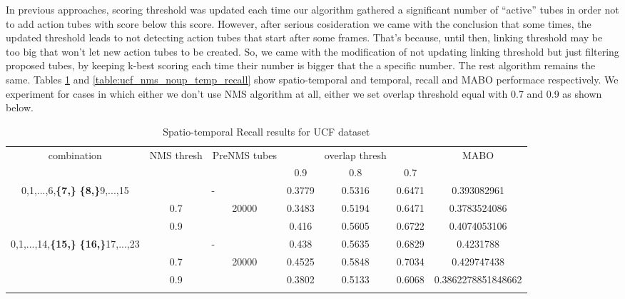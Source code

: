 \documentclass{report}
\begin{document}
In previous approaches, scoring threshold was updated each time our algorithm gathered a significant number of ``active'' tubes in order not
to add action tubes with score below this score. However, after serious cosideration we came with the conclusion that some times, the updated
threshold leads to not detecting action tubes that start after some frames. That's because, until then, linking threshold may be too big that
won't let new action tubes to be created. So, we came with the modification of not updating linking threshold but just filtering proposed
tubes, by keeping k-best scoring each time their number is bigger that the a specific number. The rest algorithm remains the same. Tables
\ref{table:ucf_nms_noup_recall} and \ref{table:ucf_nms_noup_temp_recall} show spatio-temporal and temporal, recall and MABO performace respectively.
We experiment for cases in which either we don't use NMS algorithm at all, either we set overlap threshold equal with 0.7 and 0.9 as shown
below.

\begin{center}
  \setlength{\tabcolsep}{2pt}
\begin{longtable}{||c | c | c | c c c| c|}

  \hline
  \multirow{2}{*}{combination} & \multirow{2}{2.5em}{NMS thresh} & \multirow{2}{3.5em}{PreNMS tubes} &  {} &overlap thresh & {} & \multirow{2}{*}{MABO} \\
  {} & {} & {} &  0.9 &  0.8 & 0.7 & {}\\         
  \hline
  \multirow{3}{7em}{0,1,...,6,\textbf{\{7,\}}
  \textbf{\{8,\}}9,...,15 }   &   \multicolumn{2}{|c|}{-}     &  0.3779 & 0.5316 & 0.6471 & 0.393082961 \\
  \cline{2-7}
  {} & 0.7 &\multirow{2}{*}{20000}  & 0.3483  & 0.5194 & 0.6471 & 0.3783524086 \\
  \cline{2-2} \cline{4-7} 
  {} &  0.9   & {}   & 0.416 & 0.5605 & 0.6722 & 0.4074053106 \\
  \hline                                    
  \multirow{3}{7em}{0,1,...,14,\textbf{\{15,\}}
  \textbf{\{16,\}}17,...,23 }  &   \multicolumn{2}{|c|}{-} & 0.438 & 0.5635 & 0.6829 & 0.4231788 \\
  \cline{2-7}
  {} & 0.7 & \multirow{2}{*}{20000}   & 0.4525 & 0.5848 & 0.7034 & 0.429747438 \\
  \cline{2-2} \cline{4-7} 
  {} &  0.9   & {}   & 0.3802 & 0.5133 & 0.6068 & 0.3862278851848662 \\

  \hline                                    

  \caption{Spatio-temporal Recall results for UCF dataset}
  \label{table:ucf_nms_noup_recall}
\end{longtable} 
\end{center}
\end{document}
